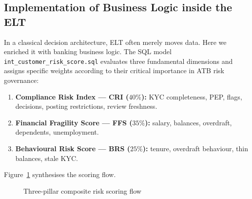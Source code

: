 \subsection{Implementation of Business Logic inside the ELT}
In a classical decision architecture, ELT often merely moves data. Here we
enriched it with banking business logic. The SQL model
\texttt{int\_customer\_risk\_score.sql} evaluates three fundamental dimensions and
assigns specific weights according to their critical importance in ATB risk
governance:
\begin{enumerate}
    \item \textbf{Compliance Risk Index --- CRI ($40\%$):} KYC completeness, PEP,
          flags, decisions, posting restrictions, review freshness.
    \item \textbf{Financial Fragility Score --- FFS ($35\%$):} salary, balances,
          overdraft, dependents, unemployment.
    \item \textbf{Behavioural Risk Score --- BRS ($25\%$):} tenure, overdraft
          behaviour, thin balances, stale KYC.
\end{enumerate}

Figure~\ref{fig:three_pillar_tikz} synthesises the scoring flow.

\begin{figure}[H]
\centering
{}
\caption{Three-pillar composite risk scoring flow}
\label{fig:three_pillar_tikz}
\end{figure}

